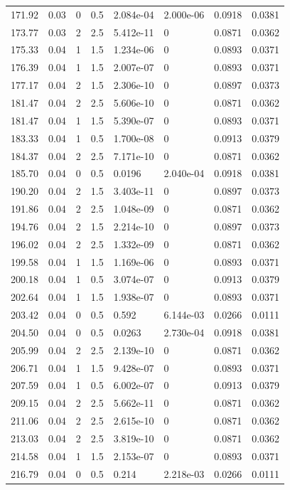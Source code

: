 \documentclass[preview]{standalone}
\begin{document}
{{{\begin{tabular}{L{1.2cm}C{1.2cm} C{0.3cm}C{0.5cm} C{1.4cm}C{1.4cm} C{1.4cm}C{1.4cm}}
  171.92  &  0.03  & 0     & 0.5 &  2.084e-04  & 2.000e-06  & 0.0918 &  0.0381   \\ 
  173.77  &  0.03  & 2     & 2.5 &  5.412e-11  & 0  & 0.0871 &  0.0362   \\ 
  175.33  &  0.04  & 1     & 1.5 &  1.234e-06  & 0  & 0.0893 &  0.0371   \\ 
  176.39  &  0.04  & 1     & 1.5 &  2.007e-07  & 0  & 0.0893 &  0.0371   \\ 
  177.17  &  0.04  & 2     & 1.5 &  2.306e-10  & 0  & 0.0897 &  0.0373   \\ 
  181.47  &  0.04  & 2     & 2.5 &  5.606e-10  & 0  & 0.0871 &  0.0362   \\ 
  181.47  &  0.04  & 1     & 1.5 &  5.390e-07  & 0  & 0.0893 &  0.0371   \\ 
  183.33  &  0.04  & 1     & 0.5 &  1.700e-08  & 0  & 0.0913 &  0.0379   \\ 
  184.37  &  0.04  & 2     & 2.5 &  7.171e-10  & 0  & 0.0871 &  0.0362   \\ 
  185.70  &  0.04  & 0     & 0.5 &  0.0196  & 2.040e-04  & 0.0918 &  0.0381   \\ 
  190.20  &  0.04  & 2     & 1.5 &  3.403e-11  & 0  & 0.0897 &  0.0373   \\ 
  191.86  &  0.04  & 2     & 2.5 &  1.048e-09  & 0  & 0.0871 &  0.0362   \\ 
  194.76  &  0.04  & 2     & 1.5 &  2.214e-10  & 0  & 0.0897 &  0.0373   \\ 
  196.02  &  0.04  & 2     & 2.5 &  1.332e-09  & 0  & 0.0871 &  0.0362   \\ 
  199.58  &  0.04  & 1     & 1.5 &  1.169e-06  & 0  & 0.0893 &  0.0371   \\ 
  200.18  &  0.04  & 1     & 0.5 &  3.074e-07  & 0  & 0.0913 &  0.0379   \\ 
  202.64  &  0.04  & 1     & 1.5 &  1.938e-07  & 0  & 0.0893 &  0.0371   \\ 
  203.42  &  0.04  & 0     & 0.5 &  0.592  & 6.144e-03  & 0.0266 &  0.0111   \\ 
  204.50  &  0.04  & 0     & 0.5 &  0.0263  & 2.730e-04  & 0.0918 &  0.0381   \\ 
  205.99  &  0.04  & 2     & 2.5 &  2.139e-10  & 0  & 0.0871 &  0.0362   \\ 
  206.71  &  0.04  & 1     & 1.5 &  9.428e-07  & 0  & 0.0893 &  0.0371   \\ 
  207.59  &  0.04  & 1     & 0.5 &  6.002e-07  & 0  & 0.0913 &  0.0379   \\ 
  209.15  &  0.04  & 2     & 2.5 &  5.662e-11  & 0  & 0.0871 &  0.0362   \\ 
  211.06  &  0.04  & 2     & 2.5 &  2.615e-10  & 0  & 0.0871 &  0.0362   \\ 
  213.03  &  0.04  & 2     & 2.5 &  3.819e-10  & 0  & 0.0871 &  0.0362   \\ 
  214.58  &  0.04  & 1     & 1.5 &  2.153e-07  & 0  & 0.0893 &  0.0371   \\ 
  216.79  &  0.04  & 0     & 0.5 &  0.214  & 2.218e-03  & 0.0266 &  0.0111   \\ 
\hline 
\end{tabular} 

}}}
\end{document}
